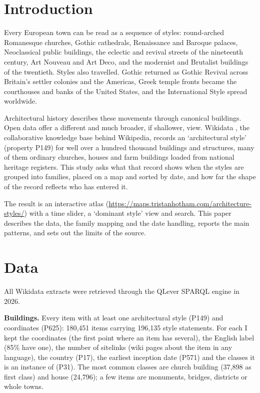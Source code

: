 \documentclass[11pt,a4paper]{article}
\begin{document}
\section{Introduction}
Every European town can be read as a sequence of styles: round-arched Romanesque churches, Gothic cathedrals, Renaissance and Baroque palaces, Neoclassical public buildings, the eclectic and revival streets of the nineteenth century, Art Nouveau and Art Deco, and the modernist and Brutalist buildings of the twentieth. Styles also travelled. Gothic returned as Gothic Revival across Britain's settler colonies and the Americas, Greek temple fronts became the courthouses and banks of the United States, and the International Style spread worldwide.

Architectural history describes these movements through canonical buildings. Open data offer a different and much broader, if shallower, view. Wikidata \citep{wikidata}, the collaborative knowledge base behind Wikipedia, records an `architectural style' (property P149) for well over a hundred thousand buildings and structures, many of them ordinary churches, houses and farm buildings loaded from national heritage registers. This study asks what that record shows when the styles are grouped into families, placed on a map and sorted by date, and how far the shape of the record reflects who has entered it.

The result is an interactive atlas (\url{https://maps.tristanhotham.com/architecture-styles/}) with a time slider, a `dominant style' view and search. This paper describes the data, the family mapping and the date handling, reports the main patterns, and sets out the limits of the source.

\section{Data}
All Wikidata extracts were retrieved through the QLever SPARQL engine \citep{qlever} in 2026.

\textbf{Buildings.} Every item with at least one architectural style (P149) and coordinates (P625): 180,451 items carrying 196,135 style statements. For each I kept the coordinates (the first point where an item has several), the English label (85\% have one), the number of sitelinks (wiki pages about the item in any language), the country (P17), the earliest inception date (P571) and the classes it is an instance of (P31). The most common classes are church building (37,898 as first class) and house (24,796); a few items are monuments, bridges, districts or whole towns.
\end{document}
